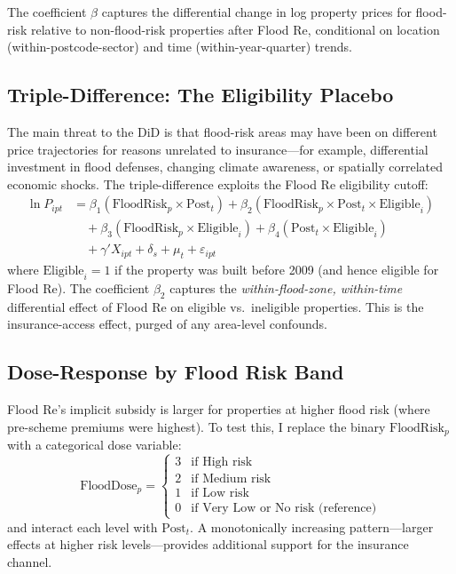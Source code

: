 \documentclass[12pt]{article}
\begin{document}
The coefficient $\beta$ captures the differential change in log property prices for flood-risk relative to non-flood-risk properties after Flood Re, conditional on location (within-postcode-sector) and time (within-year-quarter) trends.

\subsection{Triple-Difference: The Eligibility Placebo}

The main threat to the DiD is that flood-risk areas may have been on different price trajectories for reasons unrelated to insurance---for example, differential investment in flood defenses, changing climate awareness, or spatially correlated economic shocks. The triple-difference exploits the Flood Re eligibility cutoff:
\begin{align} \label{eq:ddd}
\ln P_{ipt} &= \beta_1 (\text{FloodRisk}_p \times \text{Post}_t) + \beta_2 (\text{FloodRisk}_p \times \text{Post}_t \times \text{Eligible}_i) \nonumber \\
&\quad + \beta_3 (\text{FloodRisk}_p \times \text{Eligible}_i) + \beta_4 (\text{Post}_t \times \text{Eligible}_i) \nonumber \\
&\quad + \gamma' X_{ipt} + \delta_s + \mu_t + \varepsilon_{ipt}
\end{align}
where $\text{Eligible}_i = 1$ if the property was built before 2009 (and hence eligible for Flood Re). The coefficient $\beta_2$ captures the \textit{within-flood-zone, within-time} differential effect of Flood Re on eligible vs.\ ineligible properties. This is the insurance-access effect, purged of any area-level confounds.

\subsection{Dose-Response by Flood Risk Band}

Flood Re's implicit subsidy is larger for properties at higher flood risk (where pre-scheme premiums were highest). To test this, I replace the binary $\text{FloodRisk}_p$ with a categorical dose variable:
\begin{equation}
\text{FloodDose}_p = \begin{cases} 3 & \text{if High risk} \\ 2 & \text{if Medium risk} \\ 1 & \text{if Low risk} \\ 0 & \text{if Very Low or No risk (reference)} \end{cases}
\end{equation}
and interact each level with $\text{Post}_t$. A monotonically increasing pattern---larger effects at higher risk levels---provides additional support for the insurance channel.
\end{document}
